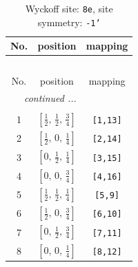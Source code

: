 \documentclass[fleqn,8pt]{jsarticle}
\begin{document}
\renewcommand{\arraystretch}{1.2}
\begin{longtable}{ccc}
\caption{Wyckoff site: {\tt 8e}, site symmetry: {\tt -1'}}
 \\
 \hline \hline
No. & position & mapping \\ \hline \endfirsthead

\multicolumn{2}{l}{\tablename\ \thetable{}} \\
 \hline \hline
No. & position & mapping \\ \hline \endhead

 \hline \hline
\multicolumn{2}{r}{\footnotesize\it continued ...} \\ \endfoot

 \hline \hline
\multicolumn{2}{r}{} \\ \endlastfoot

1 & $\left[ \frac{1}{2},\, \frac{1}{2},\, \frac{3}{4} \right]$ & {\tt [1,13]} \\ \hline
2 & $\left[ \frac{1}{2},\, 0,\, \frac{1}{4} \right]$ & {\tt [2,14]} \\ \hline
3 & $\left[ 0,\, \frac{1}{2},\, \frac{1}{4} \right]$ & {\tt [3,15]} \\ \hline
4 & $\left[ 0,\, 0,\, \frac{3}{4} \right]$ & {\tt [4,16]} \\ \hline
5 & $\left[ \frac{1}{2},\, \frac{1}{2},\, \frac{1}{4} \right]$ & {\tt [5,9]} \\ \hline
6 & $\left[ \frac{1}{2},\, 0,\, \frac{3}{4} \right]$ & {\tt [6,10]} \\ \hline
7 & $\left[ 0,\, \frac{1}{2},\, \frac{3}{4} \right]$ & {\tt [7,11]} \\ \hline
8 & $\left[ 0,\, 0,\, \frac{1}{4} \right]$ & {\tt [8,12]} \\
\end{longtable}
\renewcommand{\arraystretch}{1.2}
\end{document}
